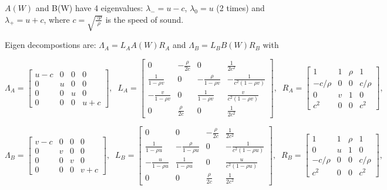 \documentclass{article}
\begin{document}
$A(W)$ and B(W) have 4 eigenvalues: $\lambda_{-}=u-c$, $\lambda_{0}=u$ (2 times) and $\lambda_{+}=u+c$, where $c=\sqrt{\frac{\gamma p}{\rho}}$ is the speed of sound.

Eigen decompostions are: $\Lambda_A = L_A A(W) R_A$ and $\Lambda_B = L_B B(W) R_B$ with

\begin{equation}
  \Lambda_A = \left[
    \begin{array}{cccc}
      u-c& 0 & 0 & 0\\
      0  & u & 0 & 0\\
      0  & 0 & u & 0\\
      0  & 0 & 0 & u+c
    \end{array}
  \right],\;\;
  L_A = \left[
    \begin{array}{cccc}
      0                  & -\frac{\rho}{2c} & 0                & \frac{1}{2c^2}\\
      \frac{1}{1-\rho v} & 0                & -\frac{\rho}{1-\rho v} & -\frac{1}{c^2 (1-\rho v)}\\
     -\frac{v}{1-\rho v} & 0                & \frac{1}{1-\rho v}     &  \frac{v}{c^2 (1-\rho v)}\\
      0 & \frac{\rho}{2c}  & 0                & \frac{1}{2c^2}
    \end{array}
  \right],\;\;
  R_A = \left[
    \begin{array}{cccc}
      1       & 1 & \rho & 1\\
      -c/\rho & 0 & 0    & c/\rho\\
      0       & v & 1    & 0\\
      c^2     & 0 & 0    & c^2
    \end{array}
  \right],\;\;
\end{equation}

\begin{equation}
  \Lambda_B = \left[
    \begin{array}{cccc}
      v-c& 0 & 0 & 0\\
      0  & v & 0 & 0\\
      0  & 0 & v & 0\\
      0  & 0 & 0 & v+c
    \end{array}
  \right],\;\;
  L_B = \left[
    \begin{array}{cccc}
      0                  & 0 &-\frac{\rho}{2c} & \frac{1}{2c^2}\\
      \frac{1}{1-\rho u} & -\frac{\rho}{1-\rho u} & 0 & -\frac{1}{c^2 (1-\rho u)}\\
     -\frac{u}{1-\rho u} &  \frac{1}{1-\rho u} & 0     &  \frac{u}{c^2 (1-\rho u)}\\
      0 & 0 & \frac{\rho}{2c} & \frac{1}{2c^2}
    \end{array}
  \right],\;\;
  R_B = \left[
    \begin{array}{cccc}
      1       & 1 & \rho & 1\\
      0       & u & 1    & 0\\
      -c/\rho & 0 & 0    & c/\rho\\
      c^2     & 0 & 0    & c^2
    \end{array}
  \right],\;\;
\end{equation}
\end{document}
